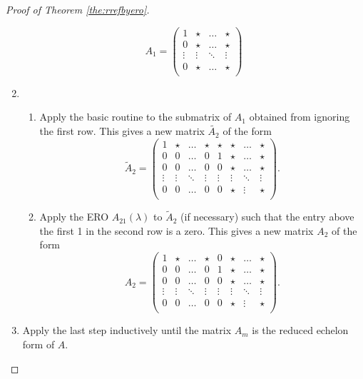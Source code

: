 \begin{proof}[Proof of Theorem \ref{the:rrefbyero}]
\begin{enumerate}
        \[
            A_1=
            \begin{pmatrix}
                1&\star&\ldots&\star\\
                0&\star&\ldots&\star\\
                \vdots&\vdots&\ddots&\vdots\\
                0&\star&\ldots&\star\\
            \end{pmatrix}
        \]
        \item
        \begin{enumerate}
            \item Apply the basic routine to the submatrix of $A_1$ obtained from ignoring the first row. This gives a new matrix $\tilde{A_2}$ of the form
            \[
                \tilde{A}_2=
                \begin{pmatrix}
                    1&\star&\ldots&\star&\star&\star&\ldots&\star\\
                    0&0&\ldots&0&1&\star&\ldots&\star\\
                    0&0&\ldots&0&0&\star&\ldots&\star\\
                    \vdots&\vdots&\ddots&\vdots&\vdots&\vdots&\ddots&\vdots\\
                    0&0&\ldots&0&0&\star&\vdots&\star\\
                \end{pmatrix}
                .
            \]
            
            \item Apply the ERO $A_{21}(\lambda)$ to $\tilde{A}_2$ (if necessary) such that the entry above the first 1 in the second row is a zero. This gives a new matrix $A_2$ of the form
            \[
                A_2=
                \begin{pmatrix}
                    1&\star&\ldots&\star&0&\star&\ldots&\star\\
                    0&0&\ldots&0&1&\star&\ldots&\star\\
                    0&0&\ldots&0&0&\star&\ldots&\star\\
                    \vdots&\vdots&\ddots&\vdots&\vdots&\vdots&\ddots&\vdots\\
                    0&0&\ldots&0&0&\star&\vdots&\star\\
                \end{pmatrix}
                .
            \]
        \end{enumerate}
        \item Apply the last step inductively until the matrix $A_m$ is the reduced echelon form of $A$.
    \end{enumerate}
\end{proof}

